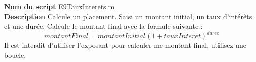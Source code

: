 \textbf{Nom du script}
E9TauxInterets.m\\
\textbf{Description}
Calcule un placement. Saisi un montant initial, un taux d'intérêts et une durée. Calcule le montant final avec la formule suivante : \[montantFinal = montantInitial(1+tauxInteret)^{duree}\]Il est interdit d'utiliser l'exposant pour calculer me montant final, utilisez une boucle.